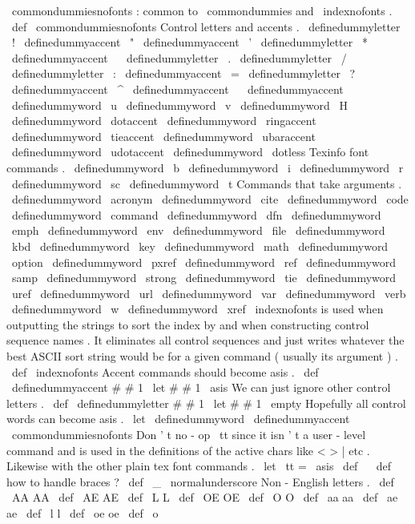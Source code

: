 {{%
\
commondummiesnofonts
:
common
to
\
commondummies
and
\
indexnofonts
.
%
\
def
\
commondummiesnofonts
{
%
%
Control
letters
and
accents
.
\
definedummyletter
\
!
%
\
definedummyaccent
\
"
%
\
definedummyaccent
\
'
%
\
definedummyletter
\
*
%
\
definedummyaccent
\
%
\
definedummyletter
\
.
%
\
definedummyletter
\
/
%
\
definedummyletter
\
:
%
\
definedummyaccent
\
=
%
\
definedummyletter
\
?
%
\
definedummyaccent
\
^
%
\
definedummyaccent
\
%
\
definedummyaccent
\
~
%
\
definedummyword
\
u
\
definedummyword
\
v
\
definedummyword
\
H
\
definedummyword
\
dotaccent
\
definedummyword
\
ringaccent
\
definedummyword
\
tieaccent
\
definedummyword
\
ubaraccent
\
definedummyword
\
udotaccent
\
definedummyword
\
dotless
%
%
Texinfo
font
commands
.
\
definedummyword
\
b
\
definedummyword
\
i
\
definedummyword
\
r
\
definedummyword
\
sc
\
definedummyword
\
t
%
%
Commands
that
take
arguments
.
\
definedummyword
\
acronym
\
definedummyword
\
cite
\
definedummyword
\
code
\
definedummyword
\
command
\
definedummyword
\
dfn
\
definedummyword
\
emph
\
definedummyword
\
env
\
definedummyword
\
file
\
definedummyword
\
kbd
\
definedummyword
\
key
\
definedummyword
\
math
\
definedummyword
\
option
\
definedummyword
\
pxref
\
definedummyword
\
ref
\
definedummyword
\
samp
\
definedummyword
\
strong
\
definedummyword
\
tie
\
definedummyword
\
uref
\
definedummyword
\
url
\
definedummyword
\
var
\
definedummyword
\
verb
\
definedummyword
\
w
\
definedummyword
\
xref
}
%
\
indexnofonts
is
used
when
outputting
the
strings
to
sort
the
index
%
by
and
when
constructing
control
sequence
names
.
It
eliminates
all
%
control
sequences
and
just
writes
whatever
the
best
ASCII
sort
string
%
would
be
for
a
given
command
(
usually
its
argument
)
.
%
\
def
\
indexnofonts
{
%
%
Accent
commands
should
become
asis
.
\
def
\
definedummyaccent
#
#
1
{
\
let
#
#
1
\
asis
}
%
%
We
can
just
ignore
other
control
letters
.
\
def
\
definedummyletter
#
#
1
{
\
let
#
#
1
\
empty
}
%
%
Hopefully
all
control
words
can
become
asis
.
\
let
\
definedummyword
\
definedummyaccent
%
\
commondummiesnofonts
%
%
Don
'
t
no
-
op
\
tt
since
it
isn
'
t
a
user
-
level
command
%
and
is
used
in
the
definitions
of
the
active
chars
like
<
>
|
etc
.
%
Likewise
with
the
other
plain
tex
font
commands
.
%
\
let
\
tt
=
\
asis
%
\
def
\
{
}
%
\
def
\
{
}
%
%
how
to
handle
braces
?
\
def
\
_
{
\
normalunderscore
}
%
%
%
Non
-
English
letters
.
\
def
\
AA
{
AA
}
%
\
def
\
AE
{
AE
}
%
\
def
\
L
{
L
}
%
\
def
\
OE
{
OE
}
%
\
def
\
O
{
O
}
%
\
def
\
aa
{
aa
}
%
\
def
\
ae
{
ae
}
%
\
def
\
l
{
l
}
%
\
def
\
oe
{
oe
}
%
\
def
\
o
{
}}}}
